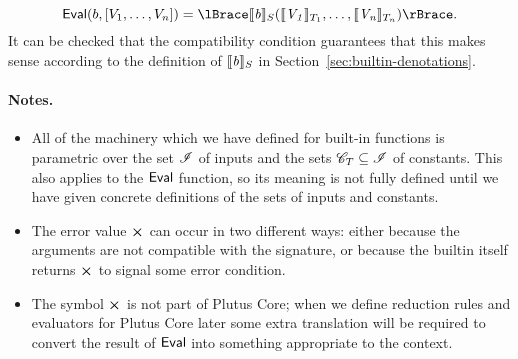$$
\Eval(b,[V_1, \ldots, V_n]) = \reify{\denote{b}_S (\denote{V_1}_{T_1}, \ldots, \denote{V_n}_{T_n})}.
$$%
%
%
\noindent It can be checked that the compatibility condition guarantees that
this makes sense according to the definition of $\llbracket\mathit{b}\rrbracket_S$ in
Section~\ref{sec:builtin-denotations}.

\paragraph{Notes.}
\begin{itemize}
  \item All of the machinery which we have defined for built-in functions is
    parametric over the set $\mathscr{I}$ of inputs and the sets $\mathscr{C}_{T} \subseteq
    \mathscr{I}$ of constants. This also applies to the $\mathsf{Eval}$ function, so its
    meaning is not fully defined until we have given concrete definitions of the
    sets of inputs and constants.
  \item The error value $\errorX$ can occur in two different ways: either
    because the arguments are not compatible with the signature, or because the
    builtin itself returns $\errorX$ to signal some error condition.
\item The symbol $\errorX$ is not part of Plutus Core; when we define reduction
  rules and evaluators for Plutus Core later some extra translation will be
  required to convert the result of $\mathsf{Eval}$ into something appropriate to the
  context.
\end{itemize}


